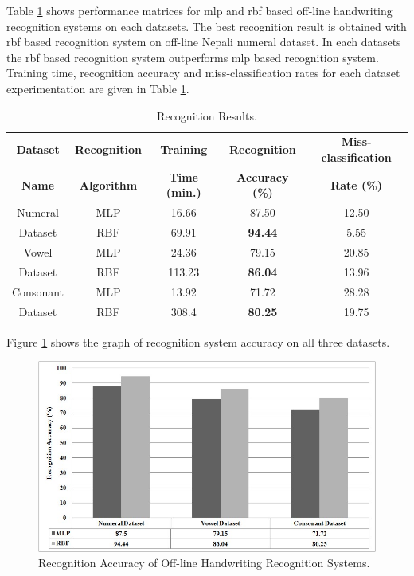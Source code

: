 \pagebreak
Table \ref{table_recognition_results} shows performance matrices for \ac{mlp} and \ac{rbf} based off-line handwriting recognition systems on each datasets. The best recognition result is obtained with \ac{rbf} based recognition system on off-line Nepali numeral dataset. In each datasets the \ac{rbf} based recognition system outperforms \ac{mlp} based recognition system. Training time, recognition accuracy and miss-classification rates for each dataset experimentation are given in Table \ref{table_recognition_results}.

\begin{table}[h]
\centering
\begin{tabular}{|c|c|c|c|c|}
\hline
\textbf{Dataset} & \textbf{Recognition} & \textbf{Training } & \textbf{Recognition } & \textbf{Miss-classification }\tabularnewline
\textbf{Name} & \textbf{Algorithm} & \textbf{Time (min.)} & \textbf{Accuracy (\%)} & \textbf{Rate (\%)}\tabularnewline
\hline
Numeral & MLP & 16.66 & 87.50 & 12.50\tabularnewline
\cline{2-5}
Dataset & RBF & 69.91 & \textbf{94.44} & 5.55\tabularnewline
\hline
Vowel & MLP & 24.36 & 79.15 & 20.85\tabularnewline
\cline{2-5}
Dataset & RBF & 113.23 & \textbf{86.04} & 13.96\tabularnewline
\hline
Consonant & MLP & 13.92 & 71.72 & 28.28\tabularnewline
\cline{2-5}
Dataset & RBF & 308.4 & \textbf{80.25} & 19.75\tabularnewline
\hline
\end{tabular}
\caption{Recognition Results.}
\label{table_recognition_results}
\end{table}


Figure \ref{figure_recognition_accuracy_graph} shows the graph of recognition system accuracy on all three datasets.
\begin{figure}[h]
\centering
\includegraphics[scale=0.60]{figures/experiments/recognition_accuracy}
\caption{Recognition Accuracy of Off-line Handwriting Recognition Systems.}
\label{figure_recognition_accuracy_graph}
\end{figure}

